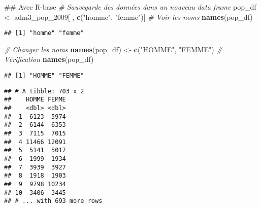 \documentclass[]{book}
\newenvironment{Shaded}{\begin{snugshade}}{\end{snugshade}}
\newcommand{\KeywordTok}[1]{\textcolor[rgb]{0.13,0.29,0.53}{\textbf{#1}}}
\newcommand{\DataTypeTok}[1]{\textcolor[rgb]{0.13,0.29,0.53}{#1}}
\newcommand{\DecValTok}[1]{\textcolor[rgb]{0.00,0.00,0.81}{#1}}
\newcommand{\StringTok}[1]{\textcolor[rgb]{0.31,0.60,0.02}{#1}}
\newcommand{\CommentTok}[1]{\textcolor[rgb]{0.56,0.35,0.01}{\textit{#1}}}
\newcommand{\OperatorTok}[1]{\textcolor[rgb]{0.81,0.36,0.00}{\textbf{#1}}}
\newcommand{\NormalTok}[1]{#1}
\begin{document}
\begin{Shaded}
\begin{Highlighting}[]
\NormalTok{## Avec R-base}
\CommentTok{# Sauvegarde des données dans un nouveau data frame}
\NormalTok{pop_df <-}\StringTok{ }\NormalTok{adm3_pop_}\DecValTok{2009}\NormalTok{[ , }\KeywordTok{c}\NormalTok{(}\StringTok{"homme"}\NormalTok{, }\StringTok{"femme"}\NormalTok{)]}
\CommentTok{# Voir les noms}
\KeywordTok{names}\NormalTok{(pop_df)}
\end{Highlighting}
\end{Shaded}

\begin{verbatim}
## [1] "homme" "femme"
\end{verbatim}

\begin{Shaded}
\begin{Highlighting}[]
\CommentTok{# Changer les noms}
\KeywordTok{names}\NormalTok{(pop_df) <-}\StringTok{ }\KeywordTok{c}\NormalTok{(}\StringTok{"HOMME"}\NormalTok{, }\StringTok{"FEMME"}\NormalTok{)}
\CommentTok{# Vérification}
\KeywordTok{names}\NormalTok{(pop_df)}
\end{Highlighting}
\end{Shaded}

\begin{verbatim}
## [1] "HOMME" "FEMME"
\end{verbatim}

\begin{Shaded}
\end{Shaded}

\begin{verbatim}
## # A tibble: 703 x 2
##    HOMME FEMME
##    <dbl> <dbl>
##  1  6123  5974
##  2  6144  6353
##  3  7115  7015
##  4 11466 12091
##  5  5141  5017
##  6  1999  1934
##  7  3939  3927
##  8  1918  1903
##  9  9798 10234
## 10  3406  3445
## # ... with 693 more rows
\end{verbatim}
\end{document}
